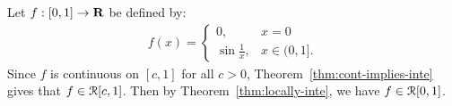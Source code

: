 \documentclass[11pt,twoside,openany]{memoir}
\begin{document}
    \begin{example}
        Let $f:[0,1] \rightarrow \mathbf{R}$ be defined by:
            \begin{equation*}
            \begin{split}
                f(x) =
                \begin{cases}
                    0, & x = 0 \\
                    \sin \frac{1}{x}, & x \in (0,1].
                \end{cases}
            \end{split}
            \end{equation*}
        Since $f$ is continuous on $[c,1]$ for all $c > 0$, Theorem~\ref{thm:cont-implies-inte} gives that $f \in \mathcal{R}[c,1]$. Then by Theorem~\ref{thm:locally-inte}, we have $f \in \mathcal{R}[0,1]$.
    \end{example}
\end{document}
